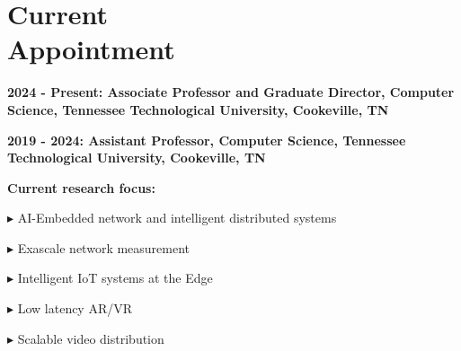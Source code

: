 
\section{Current \\Appointment}
\begin{cvlist}
\vspace{-0.6em}

\item \textbf{2024 - Present: Associate Professor and Graduate Director, Computer Science, Tennessee Technological University, Cookeville, TN}

\item \textbf{2019 - 2024: Assistant Professor,  Computer Science, Tennessee Technological University, Cookeville, TN}

\textbf{Current research focus:}

$\blacktriangleright$ AI-Embedded network and intelligent distributed systems

$\blacktriangleright$ Exascale network measurement

$\blacktriangleright$ Intelligent IoT systems at the Edge

$\blacktriangleright$ Low latency AR/VR

$\blacktriangleright$ Scalable video distribution

\end{cvlist}
